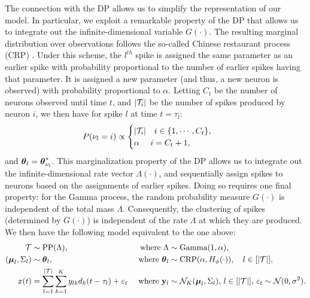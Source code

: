 The connection with the DP allows us to simplify the representation of our model. In particular, we exploit a remarkable property of the DP that
allows us to integrate out the infinite-dimensional variable $G(\cdot)$. The resulting marginal distribution over observations follows the so-called
 Chinese restaurant process (CRP) \citep{Pit2002a}. Under this scheme, the $l^{th}$ spike is assigned the same parameter as an earlier spike with probability 
proportional to the number of earlier spikes having that parameter. It is assigned a new parameter (and thus, a new neuron is observed) with probability 
proportional to $\alpha$. Letting $C_t$ be the number of neurons observed until time $t$, and  $|\mathcal{T}_i|$ be the number of spikes produced by neuron $i$,
we then have for spike $l$ at time $t = \tau_l$: 
\begin{align}
  P({\nu_l} = i) & \propto 
  \begin{cases}
   |\mathcal{T}_i| \quad i \in \{1,\cdots, C_{t}\}, \\
   \alpha \quad\ i = C_{t} + 1, 
  \end{cases}  
\label{eq:crp_marg_pr}
\end{align}
and $\boldsymbol{\theta}_l = \boldsymbol{\theta}^*_{\nu_l}$. 
This marginalization property of the DP allows us to integrate out the infinite-dimensional rate vector $\Lambda(\cdot)$, and sequentially 
assign spikes to neurons based on the assignments of earlier spikes.
Doing so requires one final property: for the Gamma process, the random probability measure $G(\cdot)$ is independent of the total mass $\Lambda$. 
Consequently, the clustering of spikes (determined by $G(\cdot)$) is independent of the rate $\Lambda$ at which they are produced. We then have
 the following model equivalent to the one above:
\begin{subequations}
\begin{align}
  \mathcal{T} &\sim \text{PP}(\Lambda), \qquad &\text{ where } \Lambda  &\sim \text{Gamma}(1,\alpha),
   \\
   (\boldsymbol{\mu}_{l}, \Sigma_{l}) &\sim \boldsymbol{\theta}_l,  &\text{ where } \boldsymbol{\theta}_l &\sim \text{CRP}(\alpha, H_{\phi}(\cdot)), \quad l \in [|\mathcal{T}|],   \label{eq:CRP}\\
  x(t) &=   \sum_{l=1}^{|\mathcal{T}|} \sum_{k=1}^K y_{lk} d_k(t - \tau_{l}) + \varepsilon_t  &\text{ where } \mathbf{y}_l &\sim \mathcal{N}_K(\boldsymbol{\mu}_{l}, \Sigma_{l}), \,  l \in [|\mathcal{T}|], \, \varepsilon_t \sim \mathcal{N}(0,\sigma^2).   \label{eq:CRP_mix}
\end{align}
\end{subequations}
